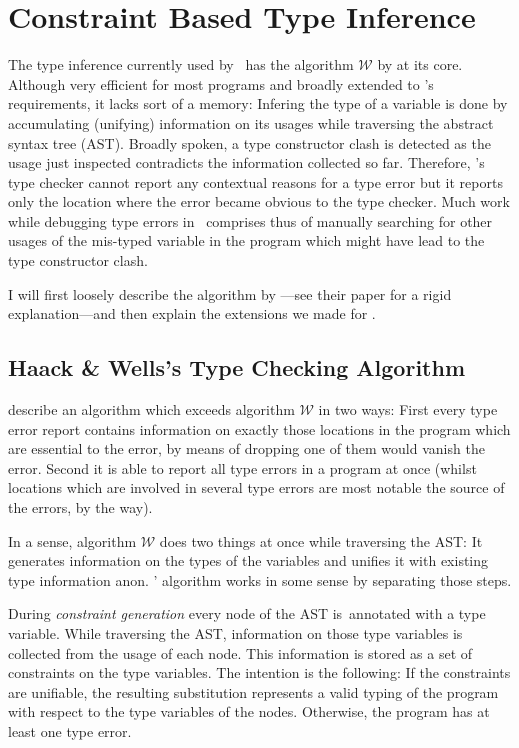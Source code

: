 
\section{Constraint Based Type Inference}
\label{sec:typeinfer}

The type inference currently used by \ocaml\ has the algorithm $\mathcal W$ by
\citet{damasmilner} at its core.
Although very efficient for most programs and broadly extended to \ocaml's 
requirements, it lacks sort of a memory:
Infering the type of a variable is done by accumulating (unifying) information
on its usages while traversing the abstract syntax tree (AST).
Broadly spoken, a type constructor clash is detected as the usage just
inspected contradicts the information collected so far.
Therefore, \ocaml's type checker cannot report any contextual reasons for a type
error but it reports only the location where the error became obvious to the
type checker.
Much work while debugging type errors in \ocaml\ comprises thus of manually
searching for other usages of the mis-typed variable in the program which might
have lead to the type constructor clash.

I will first loosely describe the algorithm by \citeauthor{haackwells04}---see
their \citeyear{haackwells04} paper for a rigid explanation---and then explain
the extensions we made for \easyocaml.


\subsection{Haack \& Wells's Type Checking Algorithm}

\citet{haackwells04} describe an algorithm which exceeds algorithm $\mathcal W$
in two ways:
First every type error report contains information on exactly those
locations in the program which are essential to the error, by means of dropping
one of them would vanish the error.
Second it is able to report all type errors in a program at once (whilst
locations which are involved in several type errors are most notable the source
of the errors, by the way).

In a sense, algorithm $\mathcal W$ does two things at once while traversing the 
AST: It generates information on the types of the variables and unifies it with
existing type information anon.  \citeauthor{haackwells04}' algorithm works in
some sense by separating those steps.

During \emph{constraint generation} every node of the AST is\wha\ annotated with
a type variable. While traversing the AST, information on those type variables
is collected from the usage of each node. This information is stored as a set of
constraints on the type variables.
The intention is the following: If the constraints are unifiable, the resulting
substitution represents a valid typing of the program with respect to the type
variables of the nodes.
Otherwise, the program has at least one type error.

